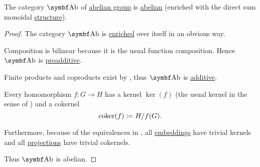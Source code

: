 \begin{proposition}\label{thm:ab_is_abelian}
  The category \( \Cat{Ab} \) of \hyperref[def:abelian_group]{abelian group} is \hyperref[def:abelian_category]{abelian} (enriched with the direct sum monoidal \hyperref[thm:ab_is_monoidal]{structure}).
\end{proposition}
\begin{proof}
  The category \( \Cat{Ab} \) is \hyperref[def:enriched_category]{enriched} over itself in an obvious way.

  Composition is bilinear because it is the usual function composition. Hence \( \Cat{Ab} \) is \hyperref[def:preadditive_category]{preadditive}.

  Finite products and coproducts exist by , thus \( \Cat{Ab} \) is \hyperref[def:additive_category]{additive}.

  Every homomorphism \( f: G \to H \) has a kernel \( \ker(f) \) (the usual kernel in the sense of ) and a cokernel
  \begin{equation*}
    \operatorname{co}\!\ker(f) \coloneqq H / f(G).
  \end{equation*}

  Furthermore, because of the equivalences in , all \hyperref[def:first_order_homomorphism/embedding]{embeddings} have trivial kernels and all \hyperref[def:first_order_homomorphism/projection]{projections} have trivial cokernels.

  Thus \( \Cat{Ab} \) is abelian.
\end{proof}

